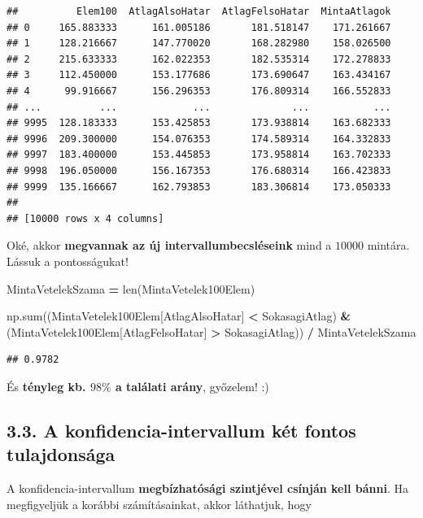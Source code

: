 \documentclass[
]{book}
\newenvironment{Shaded}{\begin{snugshade}}{\end{snugshade}}
\newcommand{\BuiltInTok}[1]{#1}
\newcommand{\NormalTok}[1]{#1}
\newcommand{\OperatorTok}[1]{\textcolor[rgb]{0.81,0.36,0.00}{\textbf{#1}}}
\newcommand{\StringTok}[1]{\textcolor[rgb]{0.31,0.60,0.02}{#1}}
\begin{document}
\begin{verbatim}
##          Elem100  AtlagAlsoHatar  AtlagFelsoHatar  MintaAtlagok
## 0     165.883333      161.005186       181.518147    171.261667
## 1     128.216667      147.770020       168.282980    158.026500
## 2     215.633333      162.022353       182.535314    172.278833
## 3     112.450000      153.177686       173.690647    163.434167
## 4      99.916667      156.296353       176.809314    166.552833
## ...          ...             ...              ...           ...
## 9995  128.183333      153.425853       173.938814    163.682333
## 9996  209.300000      154.076353       174.589314    164.332833
## 9997  183.400000      153.445853       173.958814    163.702333
## 9998  196.050000      156.167353       176.680314    166.423833
## 9999  135.166667      162.793853       183.306814    173.050333
## 
## [10000 rows x 4 columns]
\end{verbatim}

Oké, akkor \textbf{megvannak az új intervallumbecsléseink} mind a \(10000\) mintára. Lássuk a pontosságukat!

\begin{Shaded}
\begin{Highlighting}[]
\NormalTok{MintaVetelekSzama }\OperatorTok{=} \BuiltInTok{len}\NormalTok{(MintaVetelek100Elem)}

\NormalTok{np.}\BuiltInTok{sum}\NormalTok{((MintaVetelek100Elem[}\StringTok{\textquotesingle{}AtlagAlsoHatar\textquotesingle{}}\NormalTok{] }\OperatorTok{\textless{}}\NormalTok{ SokasagiAtlag) }\OperatorTok{\&}\NormalTok{ (MintaVetelek100Elem[}\StringTok{\textquotesingle{}AtlagFelsoHatar\textquotesingle{}}\NormalTok{] }\OperatorTok{\textgreater{}}\NormalTok{ SokasagiAtlag)) }\OperatorTok{/}\NormalTok{ MintaVetelekSzama}
\end{Highlighting}
\end{Shaded}

\begin{verbatim}
## 0.9782
\end{verbatim}

És \textbf{tényleg kb. \(98\%\) a találati arány}, győzelem! :)

\subsection{3.3. A konfidencia-intervallum két fontos tulajdonsága}\label{a-konfidencia-intervallum-kuxe9t-fontos-tulajdonsuxe1ga}

A konfidencia-intervallum \textbf{megbízhatósági szintjével csínján kell bánni}. Ha megfigyeljük a korábbi számításainkat, akkor láthatjuk, hogy
\end{document}

